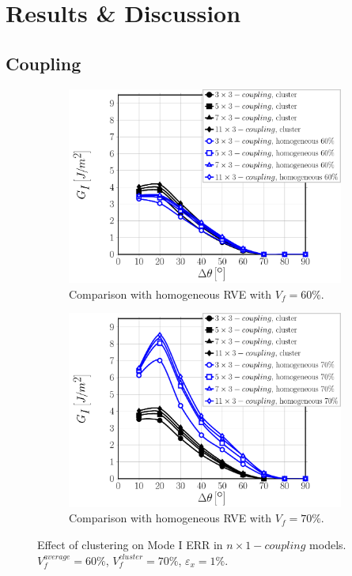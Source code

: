 \documentclass[review]{elsarticle}
\begin{document}
\section{Results \& Discussion}

\subsection{Coupling}\label{subsec:coupling}

\begin{figure}[!h]
\centering
    \begin{subfigure}[b]{0.475\textwidth}
        \includegraphics[width=\textwidth]{nx1-coupling-vf60-GI.pdf}
        \caption{Comparison with homogeneous RVE with $V_{f}=60\%$.}\label{subfig:clusterCouplingModeI60}
    \end{subfigure}\quad
    \begin{subfigure}[b]{0.475\textwidth}
        \includegraphics[width=\textwidth]{nx1-coupling-vf70-GI.pdf}
        \caption{Comparison with homogeneous RVE with $V_{f}=70\%$.}\label{subfig:clusterCouplingModeI70}
    \end{subfigure}

\caption{Effect of clustering on Mode I ERR in $n\times 1-coupling$ models. $V^{average}_{f}=60\%$, $V^{cluster}_{f}=70\%$, $\varepsilon_{x}=1\%$.}\label{fig:clusterCouplingModeI}
\end{figure}
\end{document}
